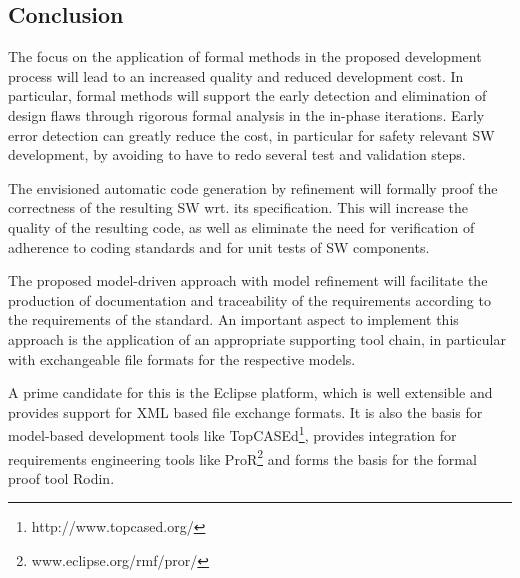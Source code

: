 \subsection{Conclusion}
\label{sec:conclusion-fm-process}

The focus on the application of formal methods in the proposed development
process will lead to an increased quality and reduced development cost. In
particular, formal methods will support the early detection and elimination of
design flaws through rigorous formal analysis in the in-phase iterations. Early
error detection can greatly reduce the cost, in particular for safety relevant
SW development, by avoiding to have to redo several test and validation steps.

The envisioned automatic code generation by refinement will formally proof the
correctness of the resulting SW wrt. its specification. This will increase the
quality of the resulting code, as well as eliminate the need for verification of
adherence to coding standards and for unit tests of SW components.

The proposed model-driven approach with model refinement will facilitate the
production of documentation and traceability of the requirements according to
the requirements of the standard. An important aspect to implement this approach
is the application of an appropriate supporting tool chain, in particular with
exchangeable file formats for the respective models.

A prime candidate for this is the Eclipse platform, which is well extensible and
provides support for XML based file exchange formats. It is also the basis for
model-based development tools like TopCASEd\footnote{http://www.topcased.org/},
provides integration for requirements engineering tools like
ProR\footnote{www.eclipse.org/rmf/pror/} and forms the basis for the formal
proof tool Rodin.


